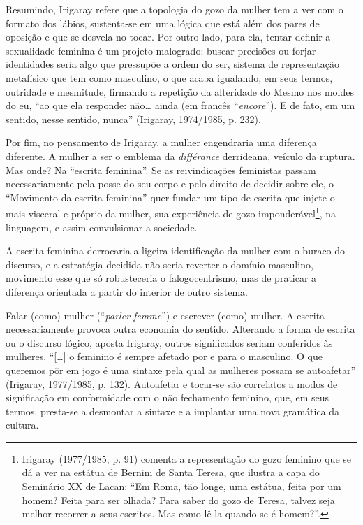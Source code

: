 Resumindo, Irigaray refere que a topologia do gozo da mulher tem a ver
com o formato dos lábios, sustenta-se em uma lógica que está além dos
pares de oposição e que se desvela no tocar. Por outro lado, para ela,
tentar definir a sexualidade feminina é um projeto malogrado: buscar
precisões ou forjar identidades seria algo que pressupõe a ordem do ser,
sistema de representação metafísico que tem como masculino, o que acaba
igualando, em seus termos, outridade e mesmitude, firmando a repetição
da alteridade do Mesmo nos moldes do eu, ``ao que ela responde: não\ldots{}
ainda (em francês ``\emph{encore}''). E de fato, em um sentido, nesse
sentido, nunca'' (Irigaray, 1974/1985, p. 232).

Por fim, no pensamento de Irigaray, a mulher engendraria uma diferença
diferente. A mulher a ser o emblema da \emph{différance} derrideana,
veículo da ruptura. Mas onde? Na ``escrita feminina''. Se as
reivindicações feministas passam necessariamente pela posse do seu corpo
e pelo direito de decidir sobre ele, o ``Movimento da escrita feminina''
quer fundar um tipo de escrita que injete o mais visceral e próprio da
mulher, sua experiência de gozo imponderável\footnote{Irigaray
  (1977/1985, p. 91) comenta a representação do gozo feminino que se dá
  a ver na estátua de Bernini de Santa Teresa, que ilustra a capa do
  Seminário XX de Lacan: ``Em Roma, tão longe, uma estátua, feita por um
  homem? Feita para ser olhada? Para saber do gozo de Teresa, talvez
  seja melhor recorrer a seus escritos. Mas como lê-la quando se é
  homem?''.}, na linguagem, e assim convulsionar a sociedade.

A escrita feminina derrocaria a ligeira identificação da mulher com o
buraco do discurso, e a estratégia decidida não seria reverter o domínio
masculino, movimento esse que só robusteceria o falogocentrismo, mas de
praticar a diferença orientada a partir do interior de outro sistema.

Falar (como) mulher (``\emph{parler-femme}'') e escrever (como) mulher.
A escrita necessariamente provoca outra economia do sentido. Alterando a
forma de escrita ou o discurso lógico, aposta Irigaray, outros
significados seriam conferidos às mulheres. ``{[}\ldots{}{]} o feminino é
sempre afetado por e para o masculino. O que queremos pôr em jogo é uma
sintaxe pela qual as mulheres possam se autoafetar'' (Irigaray,
1977/1985, p. 132). Autoafetar e tocar-se são correlatos a modos de
significação em conformidade com o não fechamento feminino, que, em seus
termos, presta-se a desmontar a sintaxe e a implantar uma nova gramática
da cultura.

